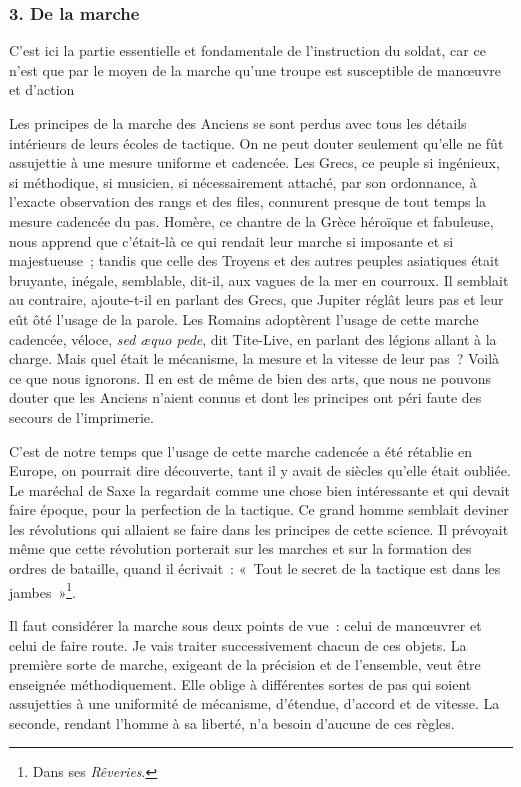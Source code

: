 \documentclass[french,twoside]{book} %
\begin{document}
\subsubsection[{3. De la marche}]{3. De la marche}
\noindent C’est ici la partie essentielle et fondamentale de l’instruction du soldat, car ce n’est que par le moyen de la marche qu’une troupe est susceptible de manœuvre et d’action\par
Les principes de la marche des Anciens se sont perdus avec tous les détails intérieurs de leurs écoles de tactique. On ne peut douter seulement qu’elle ne fût assujettie à une mesure uniforme et cadencée. Les Grecs, ce peuple si ingénieux, si méthodique, si musicien, si nécessairement attaché, par son ordonnance, à l’exacte observation des rangs et des files, connurent presque de tout temps la mesure cadencée du pas. Homère, ce chantre de la Grèce héroïque et fabuleuse, nous apprend que c’était-là ce qui rendait leur marche si imposante et si majestueuse ; tandis que celle des Troyens et des autres peuples asiatiques était bruyante, inégale, semblable, dit-il, aux vagues de la mer en courroux. Il semblait au contraire, ajoute-t-il en parlant des Grecs, que Jupiter réglât leurs pas et leur eût ôté l’usage de la parole. Les Romains adoptèrent l’usage de cette marche cadencée, véloce, {\itshape sed æquo pede}, dit Tite-Live, en parlant des légions allant à la charge. Mais quel était le mécanisme, la mesure et la vitesse de leur pas ? Voilà ce que nous ignorons. Il en est de même de bien des arts, que nous ne pouvons douter que les Anciens n’aient connus et dont les principes ont péri faute des secours de l’imprimerie.\par
C’est de notre temps que l’usage de cette marche cadencée a été rétablie en Europe, on pourrait dire découverte, tant il y avait de siècles qu’elle était oubliée. Le maréchal de Saxe la regardait comme une chose bien intéressante et qui devait faire époque, pour la perfection de la tactique. Ce grand homme semblait deviner les révolutions qui allaient se faire dans les principes de cette science. Il prévoyait même que cette révolution porterait sur les marches et sur la formation des ordres de bataille, quand il écrivait : « Tout le secret de la tactique est dans les jambes »\footnote{Dans ses {\itshape Rêveries}.}.\par
Il faut considérer la marche sous deux points de vue : celui de manœuvrer et celui de faire route. Je vais traiter successivement chacun de ces objets. La première sorte de marche, exigeant de la précision et de l’ensemble, veut être enseignée méthodiquement. Elle oblige à différentes sortes de pas qui soient assujetties à une uniformité de mécanisme, d’étendue, d’accord et de vitesse. La seconde, rendant l’homme à sa liberté, n’a besoin d’aucune de ces règles.\par
\end{document}
